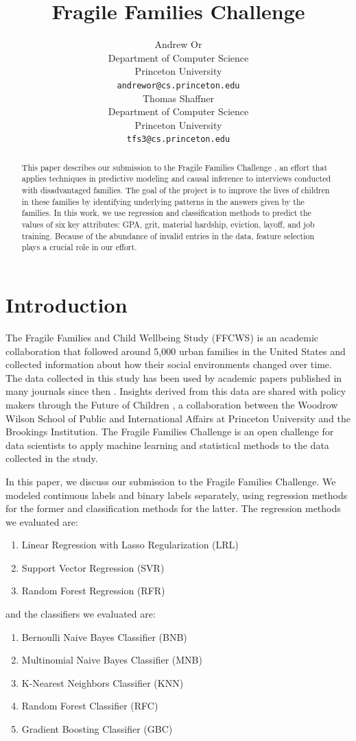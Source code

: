 \documentclass{article} %
\title{Fragile Families Challenge}
\author{
Andrew Or\\
Department of Computer Science\\
Princeton University\\
\texttt{andrewor@cs.princeton.edu} \\
\And
Thomas Shaffner \\
Department of Computer Science \\
Princeton University \\
\texttt{tfs3@cs.princeton.edu} \\
}
\begin{document}
\maketitle

\begin{abstract}

This paper describes our submission to the Fragile Families Challenge \cite{ffc}, an effort that applies techniques in predictive modeling and causal inference to interviews conducted with disadvantaged families. The goal of the project is to improve the lives of children in these families by identifying underlying patterns in the answers given by the families. In this work, we use regression and classification methods to predict the values of six key attributes: GPA, grit, material hardship, eviction, layoff, and job training. Because of the abundance of invalid entries in the data, feature selection plays a crucial role in our effort.

\end{abstract}
\section{Introduction}
\label{sec:intro}

The Fragile Families and Child Wellbeing Study (FFCWS) \cite{ffcws} is an academic collaboration that followed around 5,000 urban families in the United States and collected information about how their social environments changed over time. The data collected in this study has been used by academic papers published in many journals since then \cite{ffc_publications}. Insights derived from this data are shared with policy makers through the Future of Children \cite{foc}, a collaboration between the Woodrow Wilson School of Public and International Affairs at Princeton University and the Brookings Institution. The Fragile Families Challenge is an open challenge for data scientists to apply machine learning and statistical methods to the data collected in the study.

In this paper, we discuss our submission to the Fragile Families Challenge. We modeled continuous labels and binary labels separately, using regression methods for the former and classification methods for the latter. The regression methods we evaluated are:

\begin{enumerate}
\item Linear Regression with Lasso Regularization (LRL)
\item Support Vector Regression (SVR)
\item Random Forest Regression (RFR)
\end{enumerate}
and the classifiers we evaluated are:
\begin{enumerate}
\item Bernoulli Naive Bayes Classifier (BNB)
\item Multinomial Naive Bayes Classifier (MNB)
\item K-Nearest Neighbors Classifier (KNN)
\item Random Forest Classifier (RFC)
\item Gradient Boosting Classifier (GBC)
\end{enumerate}
\end{document}
